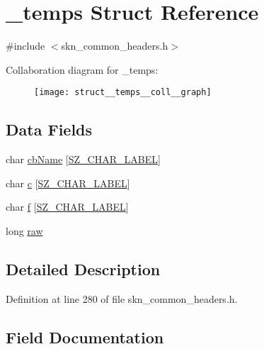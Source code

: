 \hypertarget{struct__temps}{}\section{\+\_\+temps Struct Reference}
\label{struct__temps}


{\ttfamily \#include $<$skn\+\_\+common\+\_\+headers.\+h$>$}



Collaboration diagram for \+\_\+temps\+:\nopagebreak
\begin{figure}[H]
\begin{center}
\leavevmode
\texttt{[image: struct\_\_temps\_\_coll\_\_graph]}
\end{center}
\end{figure}
\subsection*{Data Fields}
\begin{DoxyCompactItemize}
\item 
char \hyperlink{struct__temps_a74414216b43459f4ebcada36b9b165f5}{cb\+Name} \mbox{[}\hyperlink{skn__common__headers_8h_a3122b900b1a34ceff868e0d51217e357}{S\+Z\+\_\+\+C\+H\+A\+R\+\_\+\+L\+A\+B\+EL}\mbox{]}
\item 
char \hyperlink{struct__temps_add683444c2985b00bd51bc69e9026a69}{c} \mbox{[}\hyperlink{skn__common__headers_8h_a3122b900b1a34ceff868e0d51217e357}{S\+Z\+\_\+\+C\+H\+A\+R\+\_\+\+L\+A\+B\+EL}\mbox{]}
\item 
char \hyperlink{struct__temps_a9de7d7f00c6df40b61735f25e3247b40}{f} \mbox{[}\hyperlink{skn__common__headers_8h_a3122b900b1a34ceff868e0d51217e357}{S\+Z\+\_\+\+C\+H\+A\+R\+\_\+\+L\+A\+B\+EL}\mbox{]}
\item 
long \hyperlink{struct__temps_a62d3522782b91f7fbb444bceb91c1876}{raw}
\end{DoxyCompactItemize}


\subsection{Detailed Description}


Definition at line 280 of file skn\+\_\+common\+\_\+headers.\+h.



\subsection{Field Documentation}
